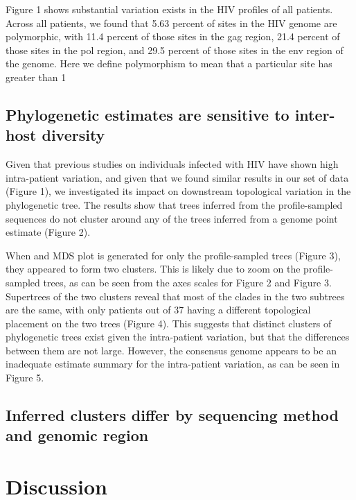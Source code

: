 \documentclass[letterpaper]{article}
\begin{document}
Figure 1 shows substantial variation exists in the HIV profiles of all patients. Across	all patients, we found that 5.63 percent of sites in the HIV genome are polymorphic, with 11.4 percent of those sites in the gag region, 21.4 percent of those sites in the pol region, and 29.5 percent of those sites in the env region of the genome. Here we define polymorphism to mean that a particular site has greater than 1%

\subsection*{Phylogenetic estimates are sensitive to inter-host diversity}

Given that previous studies on individuals infected with HIV have shown high intra-patient variation, and given that we found similar results in our set of data (Figure 1), we investigated its impact on downstream topological variation in the phylogenetic tree.  The results show that trees inferred from the profile-sampled sequences do not cluster around any of the trees inferred from a genome point estimate (Figure 2).

When and MDS plot is generated for only the profile-sampled trees (Figure 3), they appeared to form two clusters. This is likely due to zoom on the profile-sampled trees, as can be seen from the axes scales for Figure 2 and Figure 3. Supertrees of the two clusters reveal that most of the clades in the two subtrees are the same, with only patients out of 37 having a different topological placement on the two trees (Figure 4). This suggests that distinct clusters of phylogenetic trees exist given the intra-patient variation, but that the differences between them are not large.  However, the consensus genome appears to be an inadequate estimate summary for the intra-patient variation, as can be seen in Figure 5.

\subsection*{Inferred clusters differ by sequencing method and genomic region}


\section*{Discussion}
\end{document}
